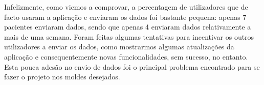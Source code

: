 Infelizmente, como viemos a comprovar, a percentagem de utilizadores que de facto usaram a aplicação e enviaram os dados foi bastante pequena: apenas 7 pacientes enviaram dados, sendo que apenas 4 enviaram dados relativamente a mais de uma semana. Foram feitas algumas tentativas para incentivar os outros utilizadores a enviar os dados, como mostrarmos algumas atualizações da aplicação e consequentemente novas funcionalidades, sem sucesso, no entanto. Esta pouca adesão no envio de dados foi o principal problema encontrado para se fazer o projeto nos moldes desejados. 


